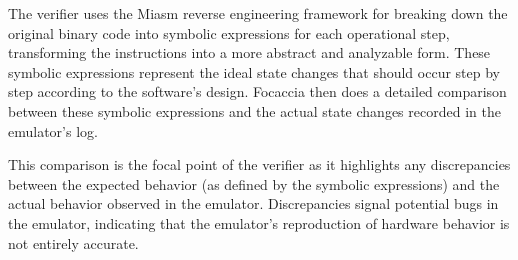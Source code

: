 The verifier uses the Miasm reverse engineering framework for breaking down the original binary code into symbolic expressions for each operational step, transforming the instructions into a more abstract and analyzable form.
These symbolic expressions represent the ideal state changes that should occur step by step according to the software's design.
Focaccia then does a detailed comparison between these  symbolic expressions and the actual state changes recorded in the emulator's log.

This comparison is the focal point of the verifier as it highlights any discrepancies between the expected behavior (as defined by the symbolic expressions) and the actual behavior observed in the emulator.
Discrepancies signal potential bugs in the emulator, indicating that the emulator's reproduction of hardware behavior is not entirely accurate.


